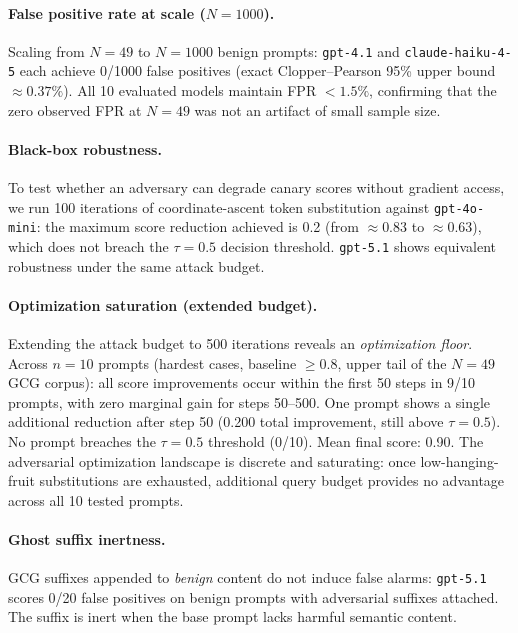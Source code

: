 \paragraph{False positive rate at scale ($N = 1000$).} Scaling from $N = 49$ to $N = 1000$ benign prompts: \texttt{gpt-4.1} and \texttt{claude-haiku-4-5} each achieve 0/1000 false positives (exact Clopper--Pearson 95\% upper bound $\approx 0.37\%$). All 10 evaluated models maintain FPR $< 1.5\%$, confirming that the zero observed FPR at $N = 49$ was not an artifact of small sample size.

\paragraph{Black-box robustness.} To test whether an adversary can degrade canary scores without gradient access, we run 100 iterations of coordinate-ascent token substitution against \texttt{gpt-4o-mini}: the maximum score reduction achieved is 0.2 (from $\approx 0.83$ to $\approx 0.63$), which does not breach the $\tau = 0.5$ decision threshold. \texttt{gpt-5.1} shows equivalent robustness under the same attack budget.

\paragraph{Optimization saturation (extended budget).} Extending the attack budget to 500 iterations reveals an \emph{optimization floor}. Across $n = 10$ prompts (hardest cases, baseline $\geq 0.8$, upper tail of the $N = 49$ GCG corpus): all score improvements occur within the first 50 steps in 9/10 prompts, with zero marginal gain for steps 50--500. One prompt shows a single additional reduction after step 50 (0.200 total improvement, still above $\tau = 0.5$). No prompt breaches the $\tau = 0.5$ threshold (0/10). Mean final score: 0.90. The adversarial optimization landscape is discrete and saturating: once low-hanging-fruit substitutions are exhausted, additional query budget provides no advantage across all 10 tested prompts.

\paragraph{Ghost suffix inertness.} GCG suffixes appended to \emph{benign} content do not induce false alarms: \texttt{gpt-5.1} scores 0/20 false positives on benign prompts with adversarial suffixes attached. The suffix is inert when the base prompt lacks harmful semantic content.


